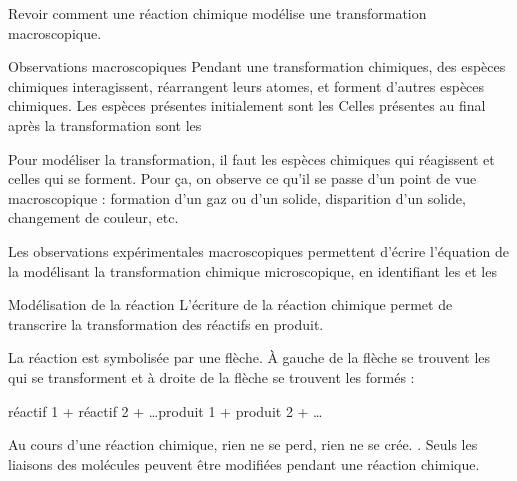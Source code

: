 \tetePremStssRedo
\vspace*{-40pt}

\begin{objectifs}
  \item Revoir comment une réaction chimique modélise une transformation macroscopique.
\end{objectifs}


\begin{doc}{Observations macroscopiques}
  Pendant une transformation chimiques, des espèces chimiques interagissent, réarrangent leurs atomes, et forment d'autres espèces chimiques.
  Les espèces présentes initialement sont les  Celles présentes au final après la transformation sont les 
  
  Pour modéliser la transformation, il faut  les espèces chimiques qui réagissent et celles qui se forment.
  Pour ça, on observe ce qu'il se passe d'un point de vue macroscopique : formation d'un gaz ou d'un solide, disparition d'un solide, changement de couleur, etc.
  
  \begin{importants}
    Les observations expérimentales macroscopiques permettent d'écrire l'équation de la  modélisant la transformation chimique microscopique, en identifiant les  et les 
  \end{importants}
\end{doc}

\begin{doc}{Modélisation de la réaction}
  L'écriture de la réaction chimique permet de transcrire la transformation des réactifs en produit.
  
  \begin{importants}
    La réaction est symbolisée par une flèche. À gauche de la flèche se trouvent les  qui se transforment et à droite de la flèche se trouvent les  formés :
    \begin{center}
      réactif 1 + réactif 2 + \ldots  \reaction produit 1 + produit 2 + \ldots
    \end{center}
  \end{importants}
  
  Au cours d'une réaction chimique, rien ne se perd, rien ne se crée. .
  Seuls les liaisons des molécules peuvent être modifiées pendant une réaction chimique.
\end{doc}


